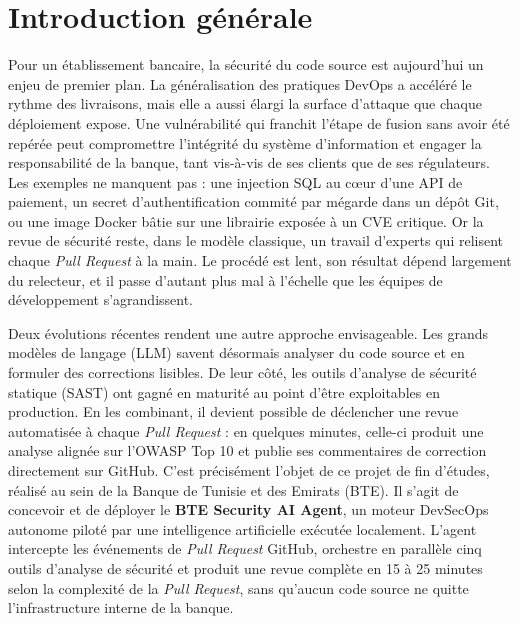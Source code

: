 \chapter*{Introduction générale}

Pour un établissement bancaire, la sécurité du code source est aujourd'hui un enjeu
de premier plan. La généralisation des pratiques DevOps a accéléré le rythme des
livraisons, mais elle a aussi élargi la surface d'attaque que chaque déploiement
expose. Une vulnérabilité qui franchit l'étape de fusion sans avoir été repérée peut
compromettre l'intégrité du système d'information et engager la responsabilité de la
banque, tant vis-à-vis de ses clients que de ses régulateurs. Les exemples ne manquent
pas : une injection SQL au cœur d'une API de paiement, un secret d'authentification
commité par mégarde dans un dépôt Git, ou une image Docker bâtie sur une librairie
exposée à un CVE critique. Or la revue de sécurité reste, dans le modèle classique,
un travail d'experts qui relisent chaque \textit{Pull Request} à la main. Le procédé
est lent, son résultat dépend largement du relecteur, et il passe d'autant plus mal
à l'échelle que les équipes de développement s'agrandissent.

Deux évolutions récentes rendent une autre approche envisageable. Les grands modèles
de langage (LLM) savent désormais analyser du code source et en formuler des
corrections lisibles. De leur côté, les outils d'analyse de sécurité statique (SAST)
ont gagné en maturité au point d'être exploitables en production. En les combinant,
il devient possible de déclencher une revue automatisée à chaque \textit{Pull Request} :
en quelques minutes, celle-ci produit une analyse alignée sur l'OWASP Top 10 et publie
ses commentaires de correction directement sur GitHub. C'est précisément l'objet de ce
projet de fin d'études, réalisé au sein de la Banque de Tunisie et des Emirats (BTE).
Il s'agit de concevoir et de déployer le \textbf{BTE Security AI Agent}, un moteur
DevSecOps autonome piloté par une intelligence artificielle exécutée localement.
L'agent intercepte les événements de \textit{Pull Request} GitHub, orchestre en
parallèle cinq outils d'analyse de sécurité et produit une revue complète en 15 à
25 minutes selon la complexité de la \textit{Pull Request}, sans qu'aucun
code source ne quitte l'infrastructure interne de la banque.

